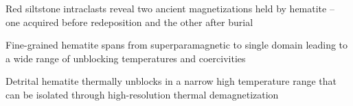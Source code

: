 \documentclass[draft]{agujournal2018}
\begin{document}




\begin{keypoints}
\item Red siltstone intraclasts reveal two ancient magnetizations held by hematite -- one acquired before redeposition and the other after burial
\item Fine-grained hematite spans from superparamagnetic to single domain leading to a wide range of unblocking temperatures and coercivities
\item  Detrital hematite thermally unblocks in a narrow high temperature range that can be isolated through high-resolution thermal demagnetization


\end{keypoints}

%
%

\end{document}
